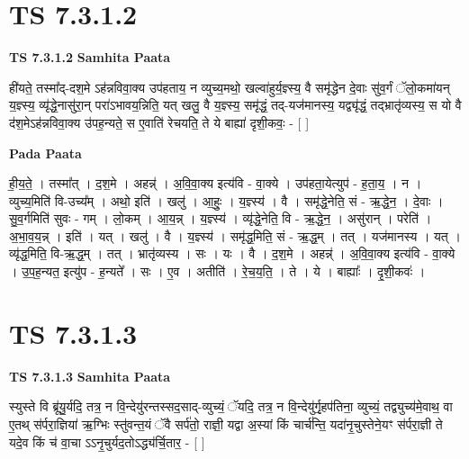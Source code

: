 \documentclass[17pt]{extarticle}
\begin{document}
\section{ TS 7.3.1.2 }

\textbf{TS 7.3.1.2 } \newline
\textbf{Samhita Paata} \newline

ही॑यते॒ तस्मा᳚द्-दश॒मे ऽह॑न्नविवा॒क्य उप॑हताय॒ न व्युच्य॒मथो॒ खल्वा॑हुर्य॒ज्ञ्स्य॒ वै समृ॑द्धेन दे॒वाः सु॑व॒र्गं ॅलो॒कमा॑यन् य॒ज्ञ्स्य॒ व्यृ॑द्धे॒नासु॑रा॒न् परा॑ऽभावय॒न्निति॒ यत् खलु॒ वै य॒ज्ञ्स्य॒ समृ॑द्धं॒ तद्-यज॑मानस्य॒ यद्व्यृ॑द्धं॒ तद्भ्रातृ॑व्यस्य॒ स यो वै द॑श॒मेऽह॑न्नविवा॒क्य उ॑पह॒न्यते॒ स ए॒वाति॑ रेचयति॒ ते ये बाह्या॑ दृशी॒कवः॒ - [  ] \newline

\textbf{Pada Paata} \newline

ही॒य॒ते॒ । तस्मा᳚त् । द॒श॒मे । अहन्न्॑ । अ॒वि॒वा॒क्य इत्य॑वि - वा॒क्ये । उप॑हता॒येत्युप॑ - ह॒ता॒य॒ । न । व्युच्य॒मिति॑ वि-उच्य᳚म् । अथो॒ इति॑ । खलु॑ । आ॒हुः॒ । य॒ज्ञ्स्य॑ । वै । समृ॑द्धे॒नेति॒ सं - ऋ॒द्धे॒न॒ । दे॒वाः । सु॒व॒र्गमिति॑ सुवः - गम् । लो॒कम् । आ॒य॒न्न् । य॒ज्ञ्स्य॑ । व्यृ॑द्धे॒नेति॒ वि - ऋ॒द्धे॒न॒ । असु॑रान् । परेति॑ । अ॒भा॒व॒य॒न्न् । इति॑ । यत् । खलु॑ । वै । य॒ज्ञ्स्य॑ । समृ॑द्ध॒मिति॒ सं - ऋ॒द्ध॒म् । तत् । यज॑मानस्य । यत् । व्यृ॑द्ध॒मिति॒ वि-ऋ॒द्ध॒म् । तत् । भ्रातृ॑व्यस्य । सः । यः । वै । द॒श॒मे । अहन्न्॑ । अ॒वि॒वा॒क्य इत्य॑वि - वा॒क्ये । उ॒प॒ह॒न्यत॒ इत्यु॑प - ह॒न्यते᳚ । सः । ए॒व । अतीति॑ । रे॒च॒य॒ति॒ । ते । ये । बाह्याः᳚ । दृ॒शी॒कवः॑ ।  \newline





\section{ TS 7.3.1.3 }

\textbf{TS 7.3.1.3 } \newline
\textbf{Samhita Paata} \newline

स्युस्ते वि ब्रू॑यु॒र्यदि॒ तत्र॒ न वि॒न्देयु॑रन्तस्सद॒साद्-व्युच्यं॒ ॅयदि॒ तत्र॒ न वि॒न्देयु॑र्गृ॒हप॑तिना॒ व्युच्यं॒ तद्व्युच्य॑मे॒वाथ॒ वा ए॒तथ् स॑र्परा॒ज्ञिया॑ ऋ॒ग्भिः स्तु॑वन्त॒यं ॅवै सर्प॑तो॒ राज्ञी॒ यद्वा अ॒स्यां किं चार्च॑न्ति॒ यदा॑नृ॒चुस्तेने॒यꣳ स॑र्परा॒ज्ञी ते यदे॒व किं च॑ वा॒चा ऽऽनृ॒चुर्यद॒तोऽद्ध्य॑र्चि॒तार॒ - [  ] \newline
\end{document}
